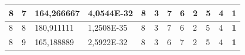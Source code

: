 \documentclass[conference]{IEEEtran}
\begin{document}
\begin{table}[]
\begin{tabular}{|llll|llllllll|}
\multicolumn{1}{|l|}{8}                                                     & \multicolumn{1}{l|}{7}                                                        & \multicolumn{1}{l|}{164,266667}                                                   & 4,0544E-32                     & \multicolumn{1}{l|}{8}                                                  & \multicolumn{1}{l|}{3}                                                  & \multicolumn{1}{l|}{7}                                                  & \multicolumn{1}{l|}{6}                                                  & \multicolumn{1}{l|}{2}                                                  & \multicolumn{1}{l|}{5}                                                  & \multicolumn{1}{l|}{4}                                                  & \textbf{1}                 \\ \hline
\multicolumn{1}{|l|}{8}                                                     & \multicolumn{1}{l|}{8}                                                        & \multicolumn{1}{l|}{180,911111}                                                   & 1,2508E-35                     & \multicolumn{1}{l|}{8}                                                  & \multicolumn{1}{l|}{3}                                                  & \multicolumn{1}{l|}{7}                                                  & \multicolumn{1}{l|}{6}                                                  & \multicolumn{1}{l|}{2}                                                  & \multicolumn{1}{l|}{5}                                                  & \multicolumn{1}{l|}{4}                                                  & \textbf{1}                 \\ \hline
\multicolumn{1}{|l|}{8}                                                     & \multicolumn{1}{l|}{9}                                                        & \multicolumn{1}{l|}{165,188889}                                                   & 2,5922E-32                     & \multicolumn{1}{l|}{8}                                                  & \multicolumn{1}{l|}{3}                                                  & \multicolumn{1}{l|}{6}                                                  & \multicolumn{1}{l|}{7}                                                  & \multicolumn{1}{l|}{2}                                                  & \multicolumn{1}{l|}{5}                                                  & \multicolumn{1}{l|}{4}                                                  & \textbf{1}                 \\ \hline

\end{tabular}
\end{table}
\end{document}
